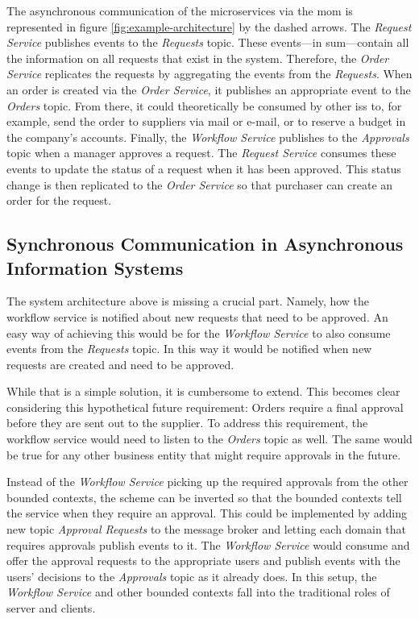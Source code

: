 The asynchronous communication of the microservices via the \gls{mom} is represented in figure \ref{fig:example-architecture} by the dashed arrows.
The \emph{Request Service} publishes events to the \emph{Requests} topic.
These events---in sum---contain all the information on all requests that exist in the system.
Therefore, the \emph{Order Service} replicates the requests by aggregating the events from the \emph{Requests}.
When an order is created via the \emph{Order Service}, it publishes an appropriate event to the \emph{Orders} topic.
From there, it could theoretically be consumed by other \glspl{is} to, for example, send the order to suppliers via mail or e-mail, or to reserve a budget in the company's accounts.
Finally, the \emph{Workflow Service} publishes to the \emph{Approvals} topic when a manager approves a request.
The \emph{Request Service} consumes these events to update the status of a request when it has been approved.
This status change is then replicated to the \emph{Order Service} so that purchaser can create an order for the request.

\subsection{Synchronous Communication in Asynchronous Information Systems}

The system architecture above is missing a crucial part.
Namely, how the workflow service is notified about new requests that need to be approved.
An easy way of achieving this would be for the \emph{Workflow Service} to also consume events from the \emph{Requests} topic.
In this way it would be notified when new requests are created and need to be approved.

While that is a simple solution, it is cumbersome to extend.
This becomes clear considering this hypothetical future requirement: Orders require a final approval before they are sent out to the supplier.
To address this requirement, the workflow service would need to listen to the \emph{Orders} topic as well.
The same would be true for any other business entity that might require approvals in the future.

Instead of the \emph{Workflow Service} picking up the required approvals from the other bounded contexts, the scheme can be inverted so that the bounded contexts tell the service when they require an approval.
This could be implemented by adding new topic \emph{Approval Requests} to the message broker and letting each domain that requires approvals publish events to it.
The \emph{Workflow Service} would consume and offer the approval requests to the appropriate users and publish events with the users' decisions to the \emph{Approvals} topic as it already does.
In this setup, the \emph{Workflow Service} and other bounded contexts fall into the traditional roles of server and clients.

